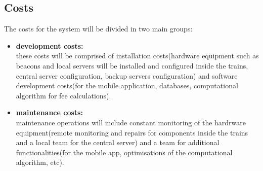 \subsection{Costs} 
The costs for the system will be divided in two main groups:
\begin{itemize}
	\item \textbf{development costs:} \\
	these costs will be comprised of installation costs(hardware equipment such as beacons and local servers will be installed and configured inside the trains, central server configuration, backup servers configuration) and software development costs(for the mobile application, databases, computational algorithm for fee calculations).
	\item \textbf{maintenance costs:} \\
	maintenance operations will include constant monitoring of the hardrware equipment(remote monitoring and repairs for components inside the trains and a local team for the central server) and a team for additional functionalities(for the mobile app, optimisations of the computational algorithm, etc).
\end{itemize}

